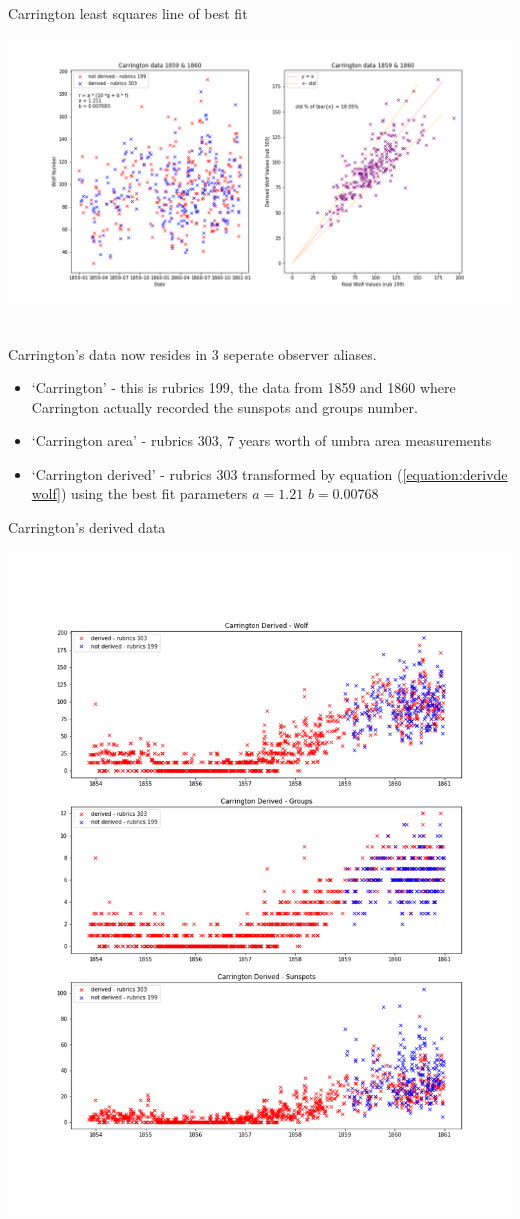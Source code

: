 \documentclass[12pt]{article}
\begin{document}
{\centering
\caption{Carrington least squares line of best fit}
\includegraphics[width=\linewidth]{carrington_fit_wolf.png}
\label{figure:carrington fit wolf}
\par}\\

Carrington's data now resides in 3 seperate observer aliases.
\begin{itemize}
    \item `Carrington' - this is rubrics 199, the data from 1859 and 1860 where Carrington actually recorded the sunspots and groups number.
    \item `Carrington area' - rubrics 303, 7 years worth of umbra area measurements
    \item `Carrington derived' - rubrics 303 transformed by equation (\ref{equation:derivde wolf}) using the best fit parameters $a=1.21$ $b=0.00768$
\end{itemize}

\newpage

{\centering
    \caption{Carrington's derived data}
    \includegraphics[width=0.9\linewidth]{carrington_derived.png}
    \label{figure:carrington derived}
\par}
\end{document}
